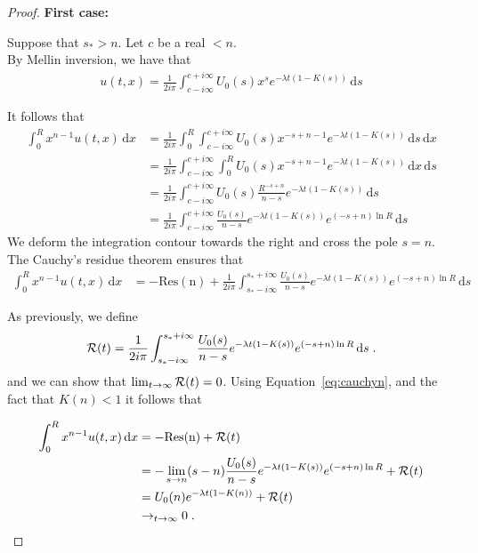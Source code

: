 \documentclass[11pt]{amsart}
\newcommand{\diff}{\,\mathrm{d}}
\begin{document}
\begin{proof}
\textbf{First case:}

Suppose that $s_* > n$. Let $c$ be a real $<n$. \\
    By Mellin inversion, we have that
    \begin{align*}
        u(t,x) = \frac{1}{2i\pi}\int_{c-i\infty}^{c+i\infty} U_0(s) x^{s} e^{-\lambda t(1 - K(s))} \diff s
    \end{align*}

It follows that
\begin{align*}
    \int_0^R x^{n-1}u(t,x) \diff x 
    &= \frac{1}{2i\pi} \int_0^R \int_{c-i\infty}^{c+i\infty} U_0(s) x^{-s+n-1} e^{-\lambda t(1 - K(s))} \diff s \diff x \\
    &= \frac{1}{2i\pi} \int_{c-i\infty}^{c+i\infty} \int_0^R U_0(s) x^{-s+n-1} e^{-\lambda t(1 - K(s))} \diff x \diff s \\
    &= \frac{1}{2i\pi} \int_{c-i\infty}^{c+i\infty} U_0(s) \frac{R^{-s+n}}{n-s} e^{-\lambda t(1 - K(s))} \diff s \\
    &= \frac{1}{2i\pi} \int_{c-i\infty}^{c+i\infty} \frac{U_0(s)}{n-s} e^{-\lambda t(1 - K(s))} e^{(-s+n)\ln R} \diff s
\end{align*}
We deform the integration contour towards the right and cross the pole $s = n$. The Cauchy's residue theorem ensures that
\begin{align}
    \int_0^R x^{n-1}u(t,x) \diff x &= -\mathrm{Res(n)} + \frac{1}{2i\pi} \int_{s_*-i\infty}^{s_*+i\infty} \frac{U_0(s)}{n-s} e^{-\lambda t(1 - K(s))} e^{(-s+n)\ln R} \diff s 
    \label{eq:cauchyn}
\end{align}


As previously, we define
\begin{align*}
    \Rcal(t) = \frac{1}{2i\pi} \int_{s_*-i\infty}^{s_*+i\infty} \frac{U_0(s)}{n-s} e^{-\lambda t(1 - K(s))} e^{(-s+n)\ln R} \diff s
    \eqfinp
\end{align*}
and we can show that $\lim_{t\to\infty}\mathcal{R}(t) = 0$. Using Equation~\ref{eq:cauchyn}, and the fact that $K(n) < 1$ it follows that 


\begin{align*}
    \int_0^R x^{n-1}u(t,x) \diff x &= -\mathrm{Res(n)} + \Rcal(t) \\
    &= -\lim_{s \to n} (s-n)\frac{U_0(s)}{n-s} e^{-\lambda t(1 - K(s))} e^{(-s+n)\ln R}  + \Rcal(t)\\
    &= U_0(n)e^{-\lambda t(1 - K(n))} + \Rcal(t)\\
    &\to_{t \to \infty} 0
    \eqfinp
\end{align*}


\end{proof}
\end{document}
